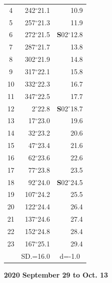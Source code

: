 \documentclass[10pt, a4paper]{report}
\begin{document}
\begin{scriptsize}
\begin{tabular*}{0.2\textwidth}[t]{@{\extracolsep{\fill}}|c|rr|}
4 & 242$^\circ$21.1 & 10.9\\
5 & 257$^\circ$21.3 & 11.9\\[2Pt]
6 & 272$^\circ$21.5 & \textbf{S}02$^\circ$12.8\\
7 & 287$^\circ$21.7 & 13.8\\
8 & 302$^\circ$21.9 & 14.8\\
9 & 317$^\circ$22.1 & \raisebox{0.24ex}{\boldmath$\cdot$~\boldmath$\cdot$~~}15.8\\
10 & 332$^\circ$22.3 & 16.7\\
11 & 347$^\circ$22.5 & 17.7\\[2Pt]
12 & 2$^\circ$22.8 & \textbf{S}02$^\circ$18.7\\
13 & 17$^\circ$23.0 & 19.6\\
14 & 32$^\circ$23.2 & 20.6\\
15 & 47$^\circ$23.4 & \raisebox{0.24ex}{\boldmath$\cdot$~\boldmath$\cdot$~~}21.6\\
16 & 62$^\circ$23.6 & 22.6\\
17 & 77$^\circ$23.8 & 23.5\\[2Pt]
18 & 92$^\circ$24.0 & \textbf{S}02$^\circ$24.5\\
19 & 107$^\circ$24.2 & 25.5\\
20 & 122$^\circ$24.4 & 26.4\\
21 & 137$^\circ$24.6 & \raisebox{0.24ex}{\boldmath$\cdot$~\boldmath$\cdot$~~}27.4\\
22 & 152$^\circ$24.8 & 28.4\\
23 & 167$^\circ$25.1 & 29.4\\
\hline
\rule{0pt}{2.4ex} & \multicolumn{1}{c}{SD.=16.0} & \multicolumn{1}{c|}{d=-1.0}\\
\hline
\end{tabular*}

\end{scriptsize}
\newpage
\sffamily
\noindent
\begin{flushright}
\textbf{2020 September 29 to Oct. 13}\par
\end{flushright}
\end{document}
